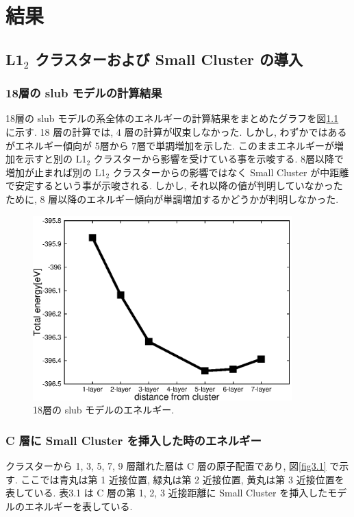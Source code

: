 \chapter{結果}
\section{ L1$_2$ クラスターおよび Small Cluster の導入}

\subsection{18層の slub モデルの計算結果}

18層の slub モデルの系全体のエネルギーの計算結果をまとめたグラフを図\ref{fig18} に示す. 18 層の計算では, 4 層の計算が収束しなかった. しかし, わずかではあるがエネルギー傾向が 5層から 7層で単調増加を示した. このままエネルギーが増加を示すと別の L1$_2$ クラスターから影響を受けている事を示唆する. 8層以降で増加が止まれば別の L1$_2$ クラスターからの影響ではなく Small Cluster が中距離で安定するという事が示唆される. しかし, それ以降の値が判明していなかったために, 8 層以降のエネルギー傾向が単調増加するかどうかが判明しなかった.

\begin{figure}[htbp]
	\begin{center}
		\includegraphics[width=100mm]{../result/small_cluster.eps}
		\caption{18層の slub モデルのエネルギー.}
		\label{fig18}
	\end{center}
\end{figure}

\subsection{C 層に Small Cluster を挿入した時のエネルギー}
クラスターから 1, 3, 5, 7, 9 層離れた層は C 層の原子配置であり, 図\ref{fig3.1} で示す. ここでは青丸は第 1 近接位置, 緑丸は第 2 近接位置, 黄丸は第 3 近接位置を表している. 表3.1 は C 層の第 1, 2, 3 近接距離に Small Cluster を挿入したモデルのエネルギーを表している.

